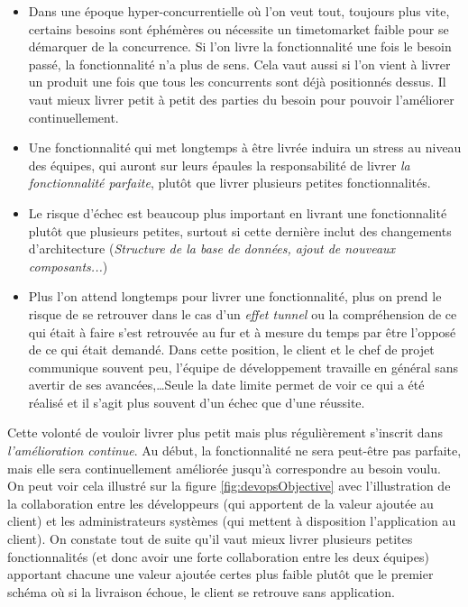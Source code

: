 \begin{itemize}
	\setlength\itemsep{0em}
	\item Dans une époque hyper-concurrentielle où l'on veut tout, toujours plus vite, certains besoins sont éphémères ou nécessite un \gls{timetomarket} faible pour se démarquer de la concurrence. Si l'on livre la fonctionnalité une fois le besoin passé, la fonctionnalité n'a plus de sens. Cela vaut aussi si l'on vient à livrer un produit une fois que tous les concurrents sont déjà positionnés dessus. Il vaut mieux livrer petit à petit des parties du besoin pour pouvoir l'améliorer continuellement.
	\item Une fonctionnalité qui met longtemps à être livrée induira un stress au niveau des équipes, qui auront sur leurs épaules la responsabilité de livrer \emph{la fonctionnalité parfaite}, plutôt que livrer plusieurs petites fonctionnalités.
	\item Le risque d'échec est beaucoup plus important en livrant une fonctionnalité plutôt que plusieurs petites, surtout si cette dernière inclut des changements d'architecture (\emph{Structure de la base de données, ajout de nouveaux composants...})
	\item Plus l'on attend longtemps pour livrer une fonctionnalité, plus on prend le risque de se retrouver dans le cas d'un \emph{effet tunnel} ou la compréhension de ce qui était à faire s'est retrouvée au fur et à mesure du temps par être l'opposé de ce qui était demandé. Dans cette position, le client et le chef de projet communique souvent peu, l'équipe de développement travaille en général sans avertir de ses avancées,\ldots Seule la date limite permet de voir ce qui a été réalisé et il s'agit plus souvent d'un échec que d'une réussite.
\end{itemize}

Cette volonté de vouloir livrer plus petit mais plus régulièrement s'inscrit dans \emph{l'amélioration continue}. Au début, la fonctionnalité ne sera peut-être pas parfaite, mais elle sera continuellement améliorée jusqu'à correspondre au besoin voulu. On peut voir cela illustré sur la figure \ref{fig:devopsObjective} avec l'illustration de la collaboration entre les développeurs (qui apportent de la valeur ajoutée au client) et les administrateurs systèmes (qui mettent à disposition l'application au client). On constate tout de suite qu'il vaut mieux livrer plusieurs petites fonctionnalités (et donc avoir une forte collaboration entre les deux équipes) apportant chacune une valeur ajoutée certes plus faible plutôt que le premier schéma où si la livraison échoue, le client se retrouve sans application.

